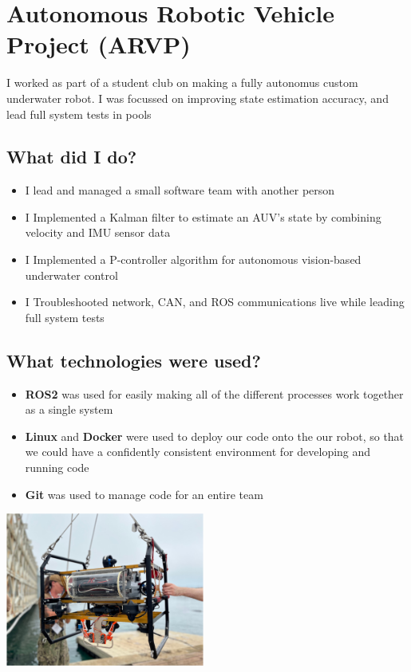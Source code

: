 \documentclass{article}
\begin{document}
\newpage
\section*{Autonomous Robotic Vehicle Project (ARVP)}
I worked as part of a student club on making a fully autonomus custom underwater robot. I was focussed on improving state estimation accuracy, and lead full system tests in pools

\begin{multicols}{2}
    \subsection*{What did I do?}
    \begin{itemize}
        \item I lead and managed a small software team with another person
        \item I Implemented a Kalman filter to estimate an AUV's state by combining velocity and IMU sensor data 
        \item I Implemented a P-controller algorithm for autonomous vision-based underwater control
        \item I Troubleshooted network, CAN, and ROS communications live while leading full system tests
    \end{itemize}
    \subsection*{What technologies were used?}
    \begin{itemize}
        \item \textbf{ROS2} was used for easily making all of the different processes work together as a single system
        \item \textbf{Linux} and \textbf{Docker} were used to deploy our code onto the our robot, so that we could have a confidently consistent environment for developing and running code
        \item \textbf{Git} was used to manage code for an entire team
    \end{itemize}
    \vspace{10cm}
    \begin{center}
        \includegraphics[width=0.49\textwidth]{images/arctos.png}
    \end{center}
\end{multicols}
    
\end{document}
